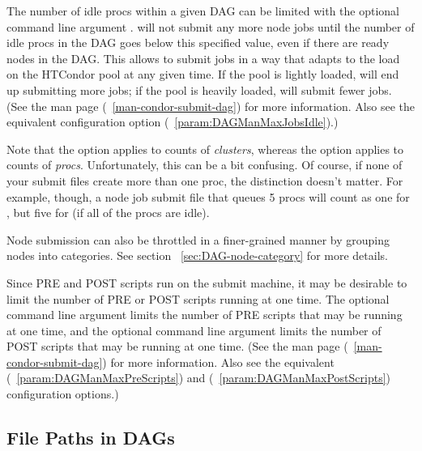 The number of idle procs within a given DAG can be limited with
the optional command line argument . 
 will not submit any more node jobs 
until the number of idle procs in the DAG goes below this
specified value,
even if there are ready nodes in the DAG.
This allows  to submit jobs in a way that adapts to
the load on the HTCondor pool at any given time.  If the pool is
lightly loaded,  will end up submitting more jobs;
if the pool is heavily loaded,  will submit fewer jobs.
(See the  man page (~\ref{man-condor-submit-dag})
for more information.  Also see the equivalent
 configuration option
(~\ref{param:DAGManMaxJobsIdle}).)

Note that the  option applies to counts of
\emph{clusters}, whereas the  option
applies to counts of \emph{procs}.  Unfortunately, this can
be a bit confusing.  Of course, if none of your submit files
create more than one proc, the distinction doesn't matter.
For example, though, a node job submit file that queues
5 procs will count as one for , but five
for  (if all of the procs are idle).

Node submission can also be throttled in a finer-grained manner by
grouping nodes into categories.  See section ~\ref{sec:DAG-node-category}
for more details.

Since PRE and POST scripts run on the submit machine,
it may be desirable to limit the number of PRE or POST scripts running
at one time.
The optional  command line argument limits the number of PRE
scripts that may be running at one time,
and the optional  command line argument limits the number
of POST scripts that may be running at one time.
(See the  man page (~\ref{man-condor-submit-dag})
for more information.  Also see the equivalent
 (~\ref{param:DAGManMaxPreScripts}) and
 (~\ref{param:DAGManMaxPostScripts})
configuration options.)

\subsection{\label{sec:DAGPaths}File Paths in DAGs}

